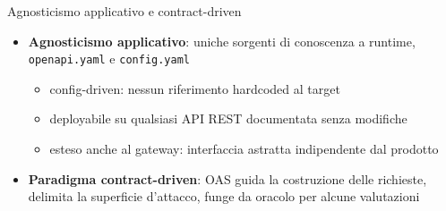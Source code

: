 
\begin{frame}{Agnosticismo applicativo e contract-driven}
  \begin{itemize}
    \item \textbf{Agnosticismo applicativo}: uniche sorgenti di conoscenza a runtime, \alert{\texttt{openapi.yaml}} e \alert{\texttt{config.yaml}}
          \begin{itemize}
            \item \alert{config-driven:} nessun riferimento hardcoded al target
            \item deployabile su \alert{qualsiasi API REST documentata} senza modifiche
            \item esteso anche al \alert{gateway}: interfaccia astratta indipendente dal prodotto
          \end{itemize}

    \item \textbf{Paradigma contract-driven}: \alert{OAS} guida la \alert{costruzione} delle richieste, delimita la \alert{superficie d'attacco}, funge da \alert{oracolo} per alcune valutazioni
  \end{itemize}
\end{frame}